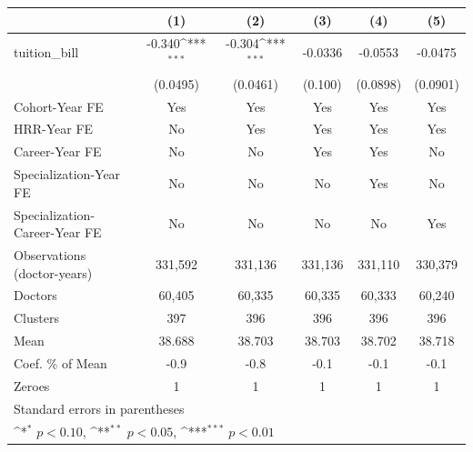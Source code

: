 {
\def\sym#1{\ifmmode^{#1}\else\(^{#1}\)\fi}
\begin{tabular}{l*{5}{c}}
\hline\hline
                    &\multicolumn{1}{c}{(1)}         &\multicolumn{1}{c}{(2)}         &\multicolumn{1}{c}{(3)}         &\multicolumn{1}{c}{(4)}         &\multicolumn{1}{c}{(5)}         \\
\hline
tuition\_bill        &      -0.340\sym{***}&      -0.304\sym{***}&     -0.0336         &     -0.0553         &     -0.0475         \\
                    &    (0.0495)         &    (0.0461)         &     (0.100)         &    (0.0898)         &    (0.0901)         \\
[1em]
Cohort-Year FE      &         Yes         &         Yes         &         Yes         &         Yes         &         Yes         \\
[1em]
HRR-Year FE         &          No         &         Yes         &         Yes         &         Yes         &         Yes         \\
[1em]
Career-Year FE      &          No         &          No         &         Yes         &         Yes         &          No         \\
[1em]
Specialization-Year FE&          No         &          No         &          No         &         Yes         &          No         \\
[1em]
Specialization-Career-Year FE&          No         &          No         &          No         &          No         &         Yes         \\
\hline
Observations (doctor-years)&     331,592         &     331,136         &     331,136         &     331,110         &     330,379         \\
Doctors             &      60,405         &      60,335         &      60,335         &      60,333         &      60,240         \\
Clusters            &         397         &         396         &         396         &         396         &         396         \\
Mean                &      38.688         &      38.703         &      38.703         &      38.702         &      38.718         \\
Coef. \% of Mean    &        -0.9         &        -0.8         &        -0.1         &        -0.1         &        -0.1         \\
Zeroes              &           1         &           1         &           1         &           1         &           1         \\
\hline\hline
\multicolumn{6}{l}{\footnotesize Standard errors in parentheses}\\
\multicolumn{6}{l}{\footnotesize \sym{*} \(p<0.10\), \sym{**} \(p<0.05\), \sym{***} \(p<0.01\)}\\
\end{tabular}
}
